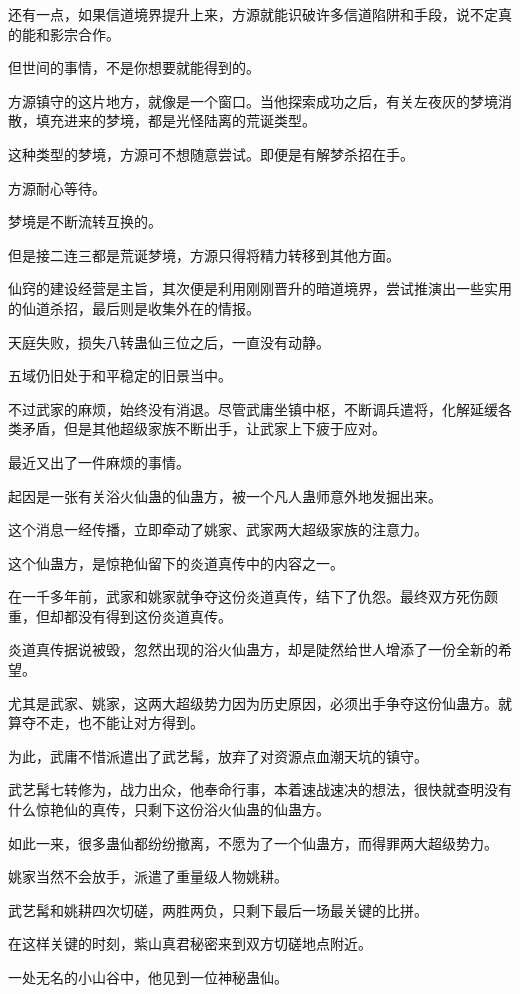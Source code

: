 \begin{this_body}
还有一点，如果信道境界提升上来，方源就能识破许多信道陷阱和手段，说不定真的能和影宗合作。

但世间的事情，不是你想要就能得到的。

方源镇守的这片地方，就像是一个窗口。当他探索成功之后，有关左夜灰的梦境消散，填充进来的梦境，都是光怪陆离的荒诞类型。

这种类型的梦境，方源可不想随意尝试。即便是有解梦杀招在手。

方源耐心等待。

梦境是不断流转互换的。

但是接二连三都是荒诞梦境，方源只得将精力转移到其他方面。

仙窍的建设经营是主旨，其次便是利用刚刚晋升的暗道境界，尝试推演出一些实用的仙道杀招，最后则是收集外在的情报。

天庭失败，损失八转蛊仙三位之后，一直没有动静。

五域仍旧处于和平稳定的旧景当中。

不过武家的麻烦，始终没有消退。尽管武庸坐镇中枢，不断调兵遣将，化解延缓各类矛盾，但是其他超级家族不断出手，让武家上下疲于应对。

最近又出了一件麻烦的事情。

起因是一张有关浴火仙蛊的仙蛊方，被一个凡人蛊师意外地发掘出来。

这个消息一经传播，立即牵动了姚家、武家两大超级家族的注意力。

这个仙蛊方，是惊艳仙留下的炎道真传中的内容之一。

在一千多年前，武家和姚家就争夺这份炎道真传，结下了仇怨。最终双方死伤颇重，但却都没有得到这份炎道真传。

炎道真传据说被毁，忽然出现的浴火仙蛊方，却是陡然给世人增添了一份全新的希望。

尤其是武家、姚家，这两大超级势力因为历史原因，必须出手争夺这份仙蛊方。就算夺不走，也不能让对方得到。

为此，武庸不惜派遣出了武艺髯，放弃了对资源点血潮天坑的镇守。

武艺髯七转修为，战力出众，他奉命行事，本着速战速决的想法，很快就查明没有什么惊艳仙的真传，只剩下这份浴火仙蛊的仙蛊方。

如此一来，很多蛊仙都纷纷撤离，不愿为了一个仙蛊方，而得罪两大超级势力。

姚家当然不会放手，派遣了重量级人物姚耕。

武艺髯和姚耕四次切磋，两胜两负，只剩下最后一场最关键的比拼。

在这样关键的时刻，紫山真君秘密来到双方切磋地点附近。

一处无名的小山谷中，他见到一位神秘蛊仙。


\end{this_body}
